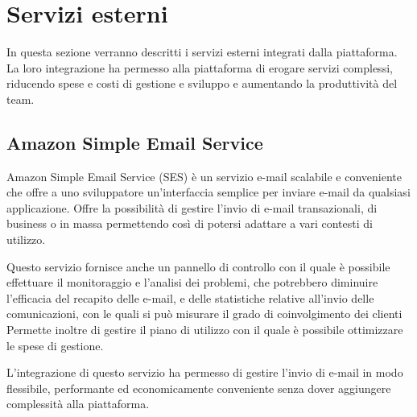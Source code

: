 \section{Servizi esterni}
In questa sezione verranno descritti i servizi esterni integrati dalla piattaforma.
La loro integrazione ha permesso alla piattaforma di erogare servizi complessi, riducendo spese e costi
di gestione e sviluppo e aumentando la produttività del team.

\subsection{Amazon Simple Email Service}
Amazon Simple Email Service \cite{AWS-SES} (SES) è un servizio e-mail scalabile e conveniente che
offre a uno sviluppatore un'interfaccia semplice per inviare e-mail da qualsiasi applicazione.
Offre la possibilità di gestire l'invio di e-mail transazionali, di business o in massa permettendo così
di potersi adattare a vari contesti di utilizzo.

Questo servizio fornisce anche un pannello di controllo con il quale è possibile effettuare il monitoraggio e l'analisi dei
problemi, che potrebbero diminuire l'efficacia del recapito delle e-mail, e delle statistiche
relative all'invio delle comunicazioni, con le quali si può misurare il grado di coinvolgimento dei clienti
Permette inoltre di gestire il piano di utilizzo con il quale è possibile ottimizzare le spese di gestione.

L'integrazione di questo servizio ha permesso di gestire l'invio di e-mail in modo flessibile, performante ed economicamente
conveniente senza dover aggiungere complessità alla piattaforma.